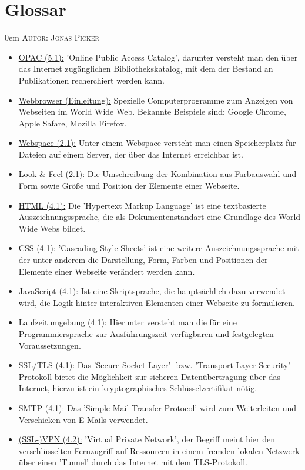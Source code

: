 \documentclass{article}
\makeatletter
\newcommand{\sectionauthor}[1]{
	{\parindent 0em \large \scshape Autor: #1 \par \nobreak \vspace*{2em}}
	\@afterheading
}
\makeatother
\begin{document}
\section{Glossar} %
\sectionauthor{Jonas Picker}
\begin{itemize}
\item \underline{OPAC (5.1):} 'Online Public Access Catalog', darunter versteht man den über das Internet zugänglichen Bibliothekskatalog, mit dem der Bestand an Publikationen recherchiert werden kann.
\item \underline{Webbrowser (Einleitung):} Spezielle Computerprogramme zum Anzeigen von Webseiten im World Wide Web. Bekannte Beispiele sind: Google Chrome, Apple Safare, Mozilla Firefox.
\item \underline{Webspace (2.1):} Unter einem Webspace versteht man einen Speicherplatz für Dateien auf einem Server, der über das Internet erreichbar ist.
\item \underline{Look \& Feel (2.1):} Die Umschreibung der Kombination aus Farbauswahl und Form sowie Größe und Position der Elemente einer Webseite.
\item \underline{HTML (4.1):} Die 'Hypertext Markup Language' ist eine textbasierte Auszeichnungssprache, die als Dokumentenstandart eine Grundlage des World Wide Webs bildet.
\item \underline{CSS (4.1):} 'Cascading Style Sheets' ist eine weitere Auszeichnungssprache mit der unter anderem die Darstellung, Form, Farben und Positionen der Elemente einer Webseite verändert werden kann.
\item \underline{JavaScript (4.1):} Ist eine Skriptsprache, die hauptsächlich dazu verwendet wird, die Logik hinter interaktiven Elementen einer Webseite zu formulieren.
\item \underline{Laufzeitumgebung (4.1):} Hierunter versteht man die für eine Programmiersprache zur Ausführungszeit verfügbaren und festgelegten Voraussetzungen.
\item \underline{SSL/TLS (4.1):} Das 'Secure Socket Layer'- bzw. 'Transport Layer Security'-Protokoll bietet die Möglichkeit zur sicheren Datenübertragung über das Internet, hierzu ist ein kryptographisches Schlüsselzertifikat nötig.
\item \underline{SMTP (4.1):} Das 'Simple Mail Transfer Protocol' wird zum Weiterleiten und Verschicken von E-Mails verwendet.
\item \underline{(SSL-)VPN (4.2):} 'Virtual Private Network', der Begriff meint hier den verschlüsselten Fernzugriff auf Ressourcen in einem fremden lokalen Netzwerk über einen 'Tunnel' durch das Internet mit dem TLS-Protokoll.

\end{itemize}
\end{document}
